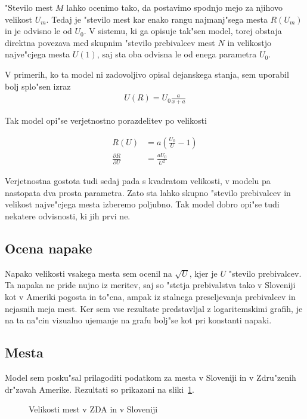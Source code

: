 \documentclass[a4paper,10pt]{article}
\begin{document}
"Stevilo mest $M$ lahko ocenimo tako, da postavimo spodnjo mejo za njihovo velikost $U_m$. Tedaj je "stevilo mest kar enako rangu najmanj"sega mesta $R(U_m)$ in je odvisno le od $U_0$. V sistemu, ki ga opisuje tak"sen model, torej obstaja direktna povezava med skupnim "stevilo prebivalcev mest $N$ in velikostjo najve"cjega mesta $U(1)$, saj sta oba odvisna le od enega parametra $U_0$. 

V primerih, ko ta model ni zadovoljivo opisal dejanskega stanja, sem uporabil bolj splo"sen izraz 
\begin{align}
 U(R) = U_0 \frac{a}{x + a}
\end{align}

Tak model opi"se verjetnostno porazdelitev po velikosti

\begin{align}
 R(U) &= a \left(\frac{U_0}{U} - 1\right) \\
 \frac{\partial R}{\partial U} &= \frac{a U_0}{U^2}
\end{align}

Verjetnostna gostota tudi sedaj pada s kvadratom velikosti, v modelu pa nastopata dva prosta parametra. Zato sta lahko skupno "stevilo prebivalcev in velikost najve"cjega mesta izberemo poljubno. Tak model dobro opi"se tudi nekatere odvisnosti, ki jih prvi ne. 

\subsection{Ocena napake}

Napako velikosti vsakega mesta sem ocenil na $\sqrt{U}$, kjer je $U$ "stevilo prebivalcev. Ta napaka ne pride nujno iz meritev, saj so "stetja prebivalstva tako v Sloveniji kot v Ameriki pogosta in to"cna, ampak iz stalnega preseljevanja prebivalcev in nejasnih meja mest. Ker sem vse rezultate predstavljal z logaritemskimi grafih, je na ta na"cin vizualno ujemanje na grafu bolj"se kot pri konstanti napaki. 

\subsection{Mesta}

Model sem posku"sal prilagoditi podatkom za mesta v Sloveniji in v Zdru"zenih dr"zavah Amerike. Rezultati so prikazani na sliki~\ref{fig:mesta}. 

\begin{figure}[!h]

\caption{Velikosti mest v ZDA in v Sloveniji} 
\label{fig:mesta}
\end{figure}
\end{document}
